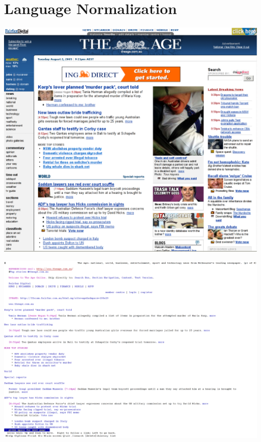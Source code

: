 \documentclass[a4paper,landscape,headrule,footrule,xetex]{foils}
\begin{document}
\section{Language Normalization}


\begin{center}
  \includegraphics[height=0.95\textheight]{../pics/firefox.eps}
\end{center}






\begin{center}
  \includegraphics[height=1.0\textheight]{../pics/lynx.eps}
\end{center}
\end{document}
